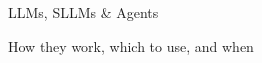 \begin{frame}[fragile]\frametitle{}
\begin{center}
{\Large LLMs, SLLMs \& Agents}

{\small How they work, which to use, and when}
\end{center}
\end{frame}



